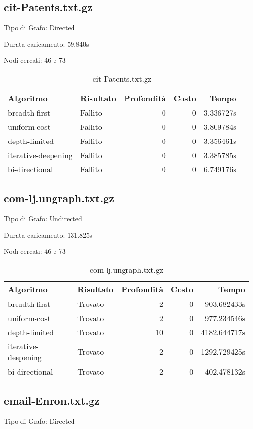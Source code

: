 \subsection{cit-Patents.txt.gz}
Tipo di Grafo: Directed

Durata caricamento: 59.840s

Nodi cercati: 46 e 73

\begin{table}[h]
\centering
\begin{tabular}{|l|l|r|r|r|}
\hline
\textbf{Algoritmo} & \textbf{Risultato} & \textbf{Profondità} & \textbf{Costo} & \textbf{Tempo} \\
 \hline
breadth-first & Fallito & 0 & 0 & 3.336727s \\
uniform-cost & Fallito & 0 & 0 & 3.809784s \\
depth-limited & Fallito & 0 & 0 & 3.356461s \\
iterative-deepening & Fallito & 0 & 0 & 3.385785s \\
bi-directional & Fallito & 0 & 0 & 6.749176s \\
\hline
\end{tabular}
\caption{cit-Patents.txt.gz}
\end{table}
\subsection{com-lj.ungraph.txt.gz}
Tipo di Grafo: Undirected

Durata caricamento: 131.825s

Nodi cercati: 46 e 73

\begin{table}[h]
\centering
\begin{tabular}{|l|l|r|r|r|}
\hline
\textbf{Algoritmo} & \textbf{Risultato} & \textbf{Profondità} & \textbf{Costo} & \textbf{Tempo} \\
 \hline
breadth-first & Trovato & 2 & 0 & 903.682433s \\
uniform-cost & Trovato & 2 & 0 & 977.234546s \\
depth-limited & Trovato & 10 & 0 & 4182.644717s \\
iterative-deepening & Trovato & 2 & 0 & 1292.729425s \\
bi-directional & Trovato & 2 & 0 & 402.478132s \\
\hline
\end{tabular}
\caption{com-lj.ungraph.txt.gz}
\end{table}
\subsection{email-Enron.txt.gz}
Tipo di Grafo: Directed

